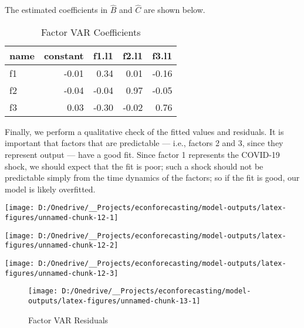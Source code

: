 \documentclass[11pt, letterpaper]{article}\usepackage[]{graphicx}\usepackage[]{color}
\begin{document}
The estimated coefficients in $\widehat{B}$ and $\widehat{C}$ are shown below.
\begin{table}[H]
\centering
\begingroup\footnotesize
\begin{tabular}{lrrrr}
  \hline
name & constant & f1.l1 & f2.l1 & f3.l1 \\ 
  \hline
f1 & -0.01 & 0.34 & 0.01 & -0.16 \\ 
  f2 & -0.04 & -0.04 & 0.97 & -0.05 \\ 
  f3 & 0.03 & -0.30 & -0.02 & 0.76 \\ 
   \hline
\end{tabular}
\endgroup
\caption{Factor VAR Coefficients} 
\end{table}



Finally, we perform a qualitative check of the fitted values and residuals. It is important that factors that are predictable --- i.e., factors 2 and 3, since they represent output --- have a good fit. Since factor 1 represents the COVID-19 shock, we should expect that the fit is poor; such a shock should not be predictable simply from the time dynamics of the factors; so if the fit is good, our model is likely overfitted.


{\centering \texttt{[image: D:/Onedrive/\_\_Projects/econforecasting/model-outputs/latex-figures/unnamed-chunk-12-1]} 

}




{\centering \texttt{[image: D:/Onedrive/\_\_Projects/econforecasting/model-outputs/latex-figures/unnamed-chunk-12-2]} 

}




{\centering \texttt{[image: D:/Onedrive/\_\_Projects/econforecasting/model-outputs/latex-figures/unnamed-chunk-12-3]} 

}





\begin{figure}[H]

{\centering \texttt{[image: D:/Onedrive/\_\_Projects/econforecasting/model-outputs/latex-figures/unnamed-chunk-13-1]} 

}

\caption[Factor VAR Residuals]{Factor VAR Residuals}\label{fig:unnamed-chunk-13}
\end{figure}
\end{document}
